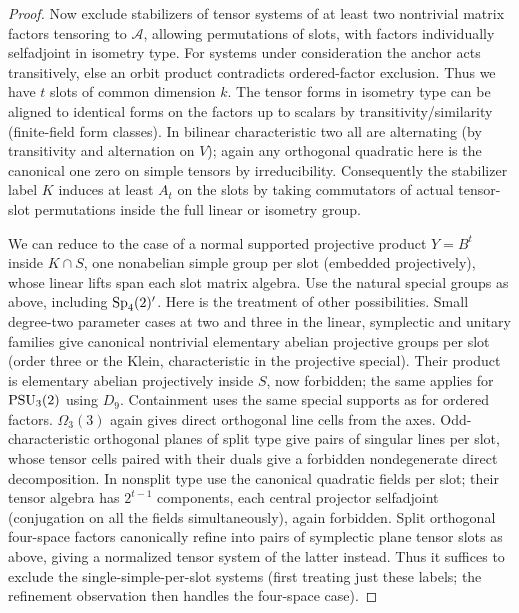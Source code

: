 \begin{proof}
Now exclude stabilizers of tensor systems of at least two nontrivial matrix factors tensoring to \(\mathcal A\), allowing permutations of slots, with factors individually selfadjoint in isometry type. For systems under consideration the anchor acts transitively, else an orbit product contradicts ordered-factor exclusion. Thus we have \(t\) slots of common dimension \(k\). The tensor forms in isometry type can be aligned to identical forms on the factors up to scalars by transitivity/similarity (finite-field form classes). In bilinear characteristic two all are alternating (by transitivity and alternation on \(V\)); again any orthogonal quadratic here is the canonical one zero on simple tensors by irreducibility. Consequently the stabilizer label \(K\) induces at least \(A_t\) on the slots by taking commutators of actual tensor-slot permutations inside the full linear or isometry group.

We can reduce to the case of a normal supported projective product \(Y=B^t\) inside \(K\cap S\), one nonabelian simple group per slot (embedded projectively), whose linear lifts span each slot matrix algebra. Use the natural special groups as above, including \({\rm Sp}_4(2)'\). Here is the treatment of other possibilities. Small degree-two parameter cases at two and three in the linear, symplectic and unitary families give canonical nontrivial elementary abelian projective groups per slot (order three or the Klein, characteristic in the projective special). Their product is elementary abelian projectively inside \(S\), now forbidden; the same applies for \({\rm PSU}_3(2)\) using \(D_9\). Containment uses the same special supports as for ordered factors. \(\Omega_3(3)\) again gives direct orthogonal line cells from the axes. Odd-characteristic orthogonal planes of split type give pairs of singular lines per slot, whose tensor cells paired with their duals give a forbidden nondegenerate direct decomposition. In nonsplit type use the canonical quadratic fields per slot; their tensor algebra has \(2^{t-1}\) components, each central projector selfadjoint (conjugation on all the fields simultaneously), again forbidden. Split orthogonal four-space factors canonically refine into pairs of symplectic plane tensor slots as above, giving a normalized tensor system of the latter instead. Thus it suffices to exclude the single-simple-per-slot systems (first treating just these labels; the refinement observation then handles the four-space case).
\end{proof}

